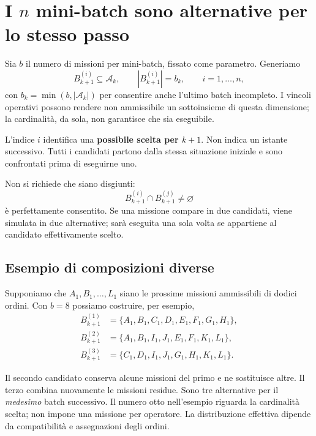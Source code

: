 \documentclass[a4paper,11pt]{article}
\begin{document}
\section{I $n$ mini-batch sono alternative per lo stesso passo}

Sia $b$ il numero di missioni per mini-batch, fissato come parametro. Generiamo
\begin{equation}
    B_{k+1}^{(i)}\subseteq\mathcal{A}_k,
    \qquad |B_{k+1}^{(i)}|=b_k,
    \qquad i=1,\ldots,n,
    \label{eq:candidati}
\end{equation}
con $b_k=\min(b,|\mathcal{A}_k|)$ per consentire anche l'ultimo batch incompleto. I vincoli operativi possono rendere non ammissibile un sottoinsieme di questa dimensione; la cardinalità, da sola, non garantisce che sia eseguibile.

L'indice $i$ identifica una \textbf{possibile scelta per $k+1$}. Non indica un istante successivo. Tutti i candidati partono dalla stessa situazione iniziale e sono confrontati prima di eseguirne uno.

Non si richiede che siano disgiunti:
\begin{equation}
    B_{k+1}^{(i)}\cap B_{k+1}^{(j)}\neq\varnothing
\end{equation}
è perfettamente consentito. Se una missione compare in due candidati, viene simulata in due alternative; sarà eseguita una sola volta se appartiene al candidato effettivamente scelto.

\subsection*{Esempio di composizioni diverse}

Supponiamo che $A_1,B_1,\ldots,L_1$ siano le prossime missioni ammissibili di dodici ordini. Con $b=8$ possiamo costruire, per esempio,
\begin{align*}
    B_{k+1}^{(1)}&=\{A_1,B_1,C_1,D_1,E_1,F_1,G_1,H_1\},\\
    B_{k+1}^{(2)}&=\{A_1,B_1,I_1,J_1,E_1,F_1,K_1,L_1\},\\
    B_{k+1}^{(3)}&=\{C_1,D_1,I_1,J_1,G_1,H_1,K_1,L_1\}.
\end{align*}

Il secondo candidato conserva alcune missioni del primo e ne sostituisce altre. Il terzo combina nuovamente le missioni residue. Sono tre alternative per il \emph{medesimo} batch successivo. Il numero otto nell'esempio riguarda la cardinalità scelta; non impone una missione per operatore. La distribuzione effettiva dipende da compatibilità e assegnazioni degli ordini.
\end{document}
